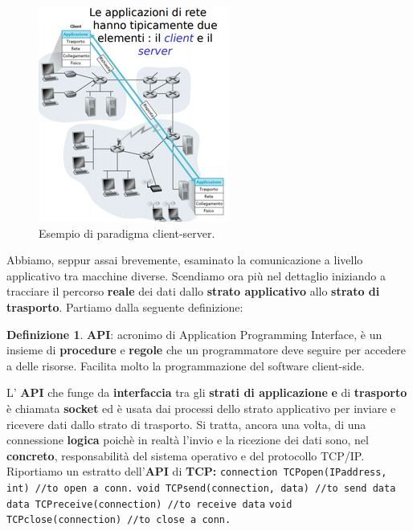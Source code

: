 \documentclass[11pt,a4paper]{article}
\theoremstyle{definition}
\newtheorem{definition}{Definizione}[section]
\begin{document}
\begin{figure}[!h]
	\includegraphics[scale=0.55]{Immagini/Client_server.png}
	\centering
	\caption{Esempio di paradigma client-server.}
\end{figure}
\newpage
Abbiamo, seppur assai brevemente, esaminato la comunicazione a livello applicativo tra macchine diverse. Scendiamo ora più nel dettaglio iniziando a tracciare il percorso \textbf{reale} dei dati dallo \textbf{strato applicativo} allo \textbf{strato di trasporto}. Partiamo dalla seguente definizione:

\theoremstyle{definition}
\begin{definition}
	\textbf{API}: acronimo di Application Programming Interface, è un insieme di \textbf{procedure} e \textbf{regole} che un programmatore deve seguire per accedere a delle risorse. Facilita molto la programmazione del software client-side.
\end{definition}
L' \textbf{API} che funge da \textbf{interfaccia} tra gli \textbf{strati di applicazione} \textbf{e} di \textbf{trasporto} è chiamata \textbf{socket} ed è usata dai processi dello strato applicativo per inviare e ricevere dati dallo strato di trasporto. Si tratta, ancora una volta, di una connessione \textbf{logica} poichè in realtà l'invio e la ricezione dei dati sono, nel \textbf{concreto}, responsabilità del sistema operativo e del protocollo TCP/IP.\newline
Riportiamo un estratto dell'\textbf{API} di \textbf{TCP:}\newline\newline
\texttt{connection TCPopen(IPaddress, int) //to open a conn.}\newline
\texttt{void TCPsend(connection, data) //to send data}\newline
\texttt{data TCPreceive(connection) //to receive data}\newline
\texttt{void TCPclose(connection) //to close a conn.}
\end{document}
